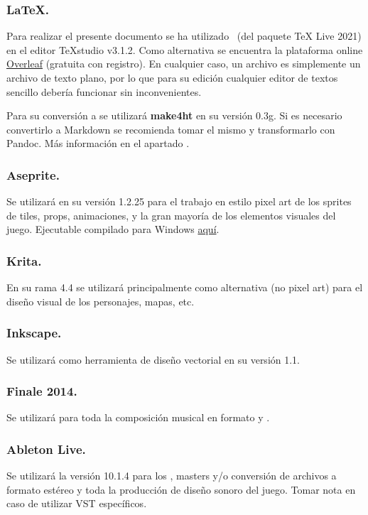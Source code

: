 \subsubsection{LaTeX.}
Para realizar el presente documento se ha utilizado \LaTeXe\ (del paquete TeX Live 2021) en el editor TeXstudio v3.1.2. Como alternativa se encuentra la plataforma online \href{https://www.overleaf.com/}{Overleaf} (gratuita con registro). En cualquier caso, un archivo  es simplemente un archivo de texto plano, por lo que para su edición cualquier editor de textos sencillo debería funcionar sin inconvenientes.

Para su conversión a  se utilizará \textbf{make4ht} en su versión 0.3g. Si es necesario convertirlo a Markdown se recomienda tomar el mismo  y transformarlo con Pandoc. Más información en el apartado .

\subsubsection{Aseprite.}
Se utilizará en su versión 1.2.25 para el trabajo en estilo pixel art de los sprites de tiles, props, animaciones,  y la gran mayoría de los elementos visuales del juego. Ejecutable compilado para Windows \href{https://drive.google.com/drive/folders/1DPhGeg7WzV9j81u3B5isgsXqoMtfd_Uv?usp=sharing}{aquí}.

\subsubsection{Krita.}
En su rama 4.4 se utilizará principalmente como alternativa (no pixel art) para el diseño visual de los personajes, mapas, etc.

\subsubsection{Inkscape.}
Se utilizará como herramienta de diseño vectorial en su versión 1.1.

\subsubsection{Finale 2014.}
Se utilizará para toda la composición musical en formato  y .

\subsubsection{Ableton Live.}
Se utilizará la versión 10.1.4 para los , masters y/o conversión de archivos  a formato  estéreo y toda la producción de diseño sonoro del juego. Tomar nota en caso de utilizar VST específicos.

